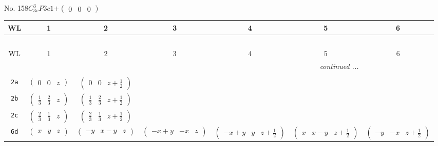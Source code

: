 \documentclass[fleqn,9pt,landscape]{jsarticle}
\begin{document}
\newpage
No. 158\quad$C_{3v}^{3}$\quad$P3c1$\quad[ trigonal ]\quad$+\begin{pmatrix} 0 & 0 & 0 \end{pmatrix}$
\begin{center}
\renewcommand{\arraystretch}{1.2}
\begin{longtable}{ccccccc}
 \hline \hline
WL & 1 & 2 & 3 & 4 & 5 & 6 \\ \hline \endfirsthead

\multicolumn{6}{l}{\tablename\ \thetable{}} \\
 \hline \hline
WL & 1 & 2 & 3 & 4 & 5 & 6 \\ \hline \endhead

 \hline \hline
\multicolumn{6}{r}{\footnotesize\it continued ...} \\ \endfoot

 \hline \hline
\multicolumn{6}{r}{} \\ \endlastfoot

{\tt 2a} & $ \begin{pmatrix} 0 & 0 & z \end{pmatrix} $ & $ \begin{pmatrix} 0 & 0 & z + \frac{1}{2} \end{pmatrix} $ & $  $ & $  $ & $  $ & $  $ \\ \hline
{\tt 2b} & $ \begin{pmatrix} \frac{1}{3} & \frac{2}{3} & z \end{pmatrix} $ & $ \begin{pmatrix} \frac{1}{3} & \frac{2}{3} & z + \frac{1}{2} \end{pmatrix} $ & $  $ & $  $ & $  $ & $  $ \\ \hline
{\tt 2c} & $ \begin{pmatrix} \frac{2}{3} & \frac{1}{3} & z \end{pmatrix} $ & $ \begin{pmatrix} \frac{2}{3} & \frac{1}{3} & z + \frac{1}{2} \end{pmatrix} $ & $  $ & $  $ & $  $ & $  $ \\ \hline
{\tt 6d} & $ \begin{pmatrix} x & y & z \end{pmatrix} $ & $ \begin{pmatrix} - y & x - y & z \end{pmatrix} $ & $ \begin{pmatrix} - x + y & - x & z \end{pmatrix} $ & $ \begin{pmatrix} - x + y & y & z + \frac{1}{2} \end{pmatrix} $ & $ \begin{pmatrix} x & x - y & z + \frac{1}{2} \end{pmatrix} $ & $ \begin{pmatrix} - y & - x & z + \frac{1}{2} \end{pmatrix} $ \\
\end{longtable}
\end{center}
\end{document}

